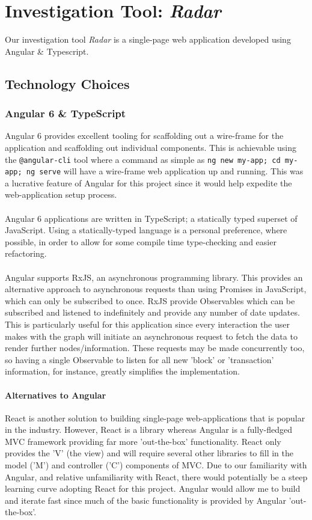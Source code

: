 \chapter{Investigation Tool: \textit{Radar}}\label{section-investigation-tool}
Our investigation tool \textit{Radar} is a single-page web application developed using Angular \& Typescript. 

\section{Technology Choices}
\subsection{Angular 6 \& TypeScript}
Angular 6 provides excellent tooling for scaffolding out a wire-frame for the application and scaffolding out individual components. This is achievable using the \texttt{@angular-cli} tool where a command as simple as \texttt{ng new my-app; cd my-app; ng serve} will have a wire-frame web application up and running. This was a lucrative feature of Angular for this project since it would help expedite the web-application setup process.
\\\\
Angular 6 applications are written in TypeScript; a statically typed superset of JavaScript. Using a statically-typed language is a personal preference, where possible, in order to allow for some compile time type-checking and easier refactoring. 
\\\\
Angular supports RxJS, an asynchronous programming library. This provides an alternative approach to asynchronous requests than using Promises in JavaScript, which can only be subscribed to once. RxJS provide Observables which can be subscribed and listened to indefinitely and provide any number of date updates. This is particularly useful for this application since every interaction the user makes with the graph will initiate an asynchronous request to fetch the data to render further nodes/information. These requests may be made concurrently too, so having a single Observable to listen for all new 'block' or 'transaction' information, for instance, greatly simplifies the implementation.

\subsubsection{Alternatives to Angular}
React is another solution to building single-page web-applications that is popular in the industry. However, React is a library whereas Angular is a fully-fledged MVC framework providing far more 'out-the-box' functionality. React only provides the 'V' (the view) and will require several other libraries to fill in the model ('M') and controller ('C') components of MVC. Due to our familiarity with Angular, and relative unfamiliarity with React, there would potentially be a steep learning curve adopting React for this project. Angular would allow me to build and iterate fast since much of the basic functionality is provided by Angular 'out-the-box'.

